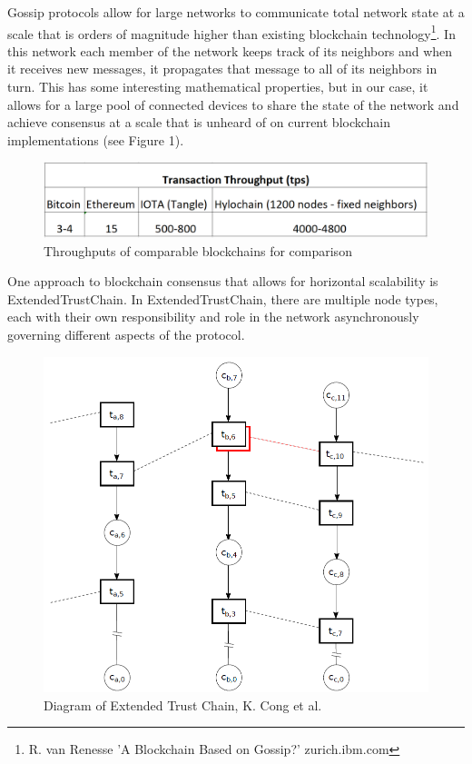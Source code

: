 \documentclass{article}
\begin{document}
Gossip protocols allow for large networks to communicate total network state at a scale that is orders of magnitude higher than existing blockchain technology\footnote{R. van Renesse 'A Blockchain Based on Gossip?' zurich.ibm.com}. In this network each member of the network keeps track of its neighbors and when it receives new messages, it propagates that message to all of its neighbors in turn. This has some interesting mathematical properties, but in our case, it allows for a large pool of connected devices to share the state of the network and achieve consensus at a scale that is unheard of on current blockchain implementations (see Figure 1).

\begin{figure}[H]
\centering
\includegraphics[scale=0.30]{Throughput.png}
\caption{Throughputs of comparable blockchains for comparison}
\end{figure} 

One approach to blockchain consensus that allows for horizontal scalability is ExtendedTrustChain. In ExtendedTrustChain, there are multiple node types, each with their own responsibility and role in the network asynchronously governing different aspects of the protocol. 

\begin{figure}[H]
\centering
\includegraphics[scale=0.62]{kcong-extended-trust-chain.PNG}
\caption{Diagram of Extended Trust Chain, K. Cong et al.}
\end{figure} 
\end{document}
